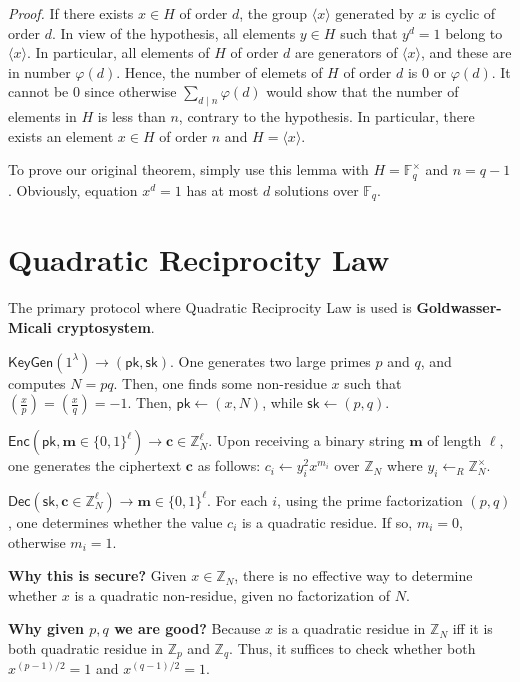 \documentclass{template}
\begin{document}
\textit{Proof.} If there exists $x \in H$ of order $d$, the group $\langle x
\rangle$ generated by $x$ is cyclic of order $d$. In view of the hypothesis, all
elements $y \in H$ such that $y^d=1$ belong to $\langle x \rangle$. In
particular, all elements of $H$ of order $d$ are generators of $\langle x
\rangle$, and these are in number $\varphi(d)$. Hence, the number of elemets of
$H$ of order $d$ is $0$ or $\varphi(d)$. It cannot be $0$ since otherwise
$\sum_{d \mid n}\varphi(d)$ would show that the number of elements in $H$ is
less than $n$, contrary to the hypothesis. In particular, there exists an
element $x \in H$ of order $n$ and $H=\langle x \rangle$.

To prove our original theorem, simply use this lemma with
$H=\mathbb{F}_q^{\times}$ and $n=q-1$. Obviously, equation $x^d=1$ has at most
$d$ solutions over $\mathbb{F}_q$.

\section*{Quadratic Reciprocity Law}

The primary protocol where Quadratic Reciprocity Law is used 
is \textbf{Goldwasser-Micali cryptosystem}. 

$\mathsf{KeyGen}(1^{\lambda}) \to (\mathsf{pk}, \mathsf{sk})$. One generates two
large primes $p$ and $q$, and computes $N = pq$. Then, one finds some
non-residue $x$ such that $\left(\frac{x}{p}\right) = \left(\frac{x}{q}\right) =
-1$. Then, $\mathsf{pk} \gets (x, N)$, while $\mathsf{sk} \gets (p,q)$.

$\mathsf{Enc}(\mathsf{pk}, \mathbf{m} \in \{0,1\}^{\ell}) \to \mathbf{c} \in
\mathbb{Z}_N^{\ell}$. Upon receiving a binary string $\mathbf{m}$ of length
$\ell$, one generates the ciphertext $\mathbf{c}$ as follows: $c_i \gets
y_i^2x^{m_i}$ over $\mathbb{Z}_N$ where $y_i \leftarrow_R
\mathbb{Z}_N^{\times}$.

$\mathsf{Dec}(\mathsf{sk}, \mathbf{c} \in \mathbb{Z}_N^{\ell}) \to \mathbf{m} \in
\{0,1\}^{\ell}$. For each $i$, using the prime factorization $(p,q)$, one
determines whether the value $c_i$ is a quadratic residue. If so, $m_i=0$,
otherwise $m_i=1$.

\textbf{Why this is secure?} Given $x \in \mathbb{Z}_N$, there is no effective
way to determine whether $x$ is a quadratic non-residue, given no factorization 
of $N$.

\textbf{Why given $p,q$ we are good?} Because $x$ is a quadratic residue in
$\mathbb{Z}_N$ iff it is both quadratic residue in $\mathbb{Z}_p$ and
$\mathbb{Z}_q$. Thus, it suffices to check whether both $x^{(p-1)/2}=1$ and
$x^{(q-1)/2}=1$.
 
\end{document}
